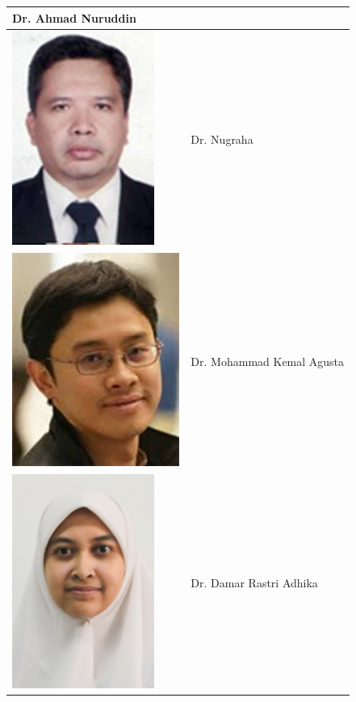 \documentclass[a0,landscape]{a0poster}
\begin{document}
\begin{multicols}{3}
\begin{tcolorbox}[
  colback=blue!5,
  colframe=green!40!black,
  title=Anggota]
{\begin{tabular}{
|>{\centering\arraybackslash}m{8cm}
|>{\centering\arraybackslash}m{25cm}|}
Dr. Ahmad Nuruddin \\
\hline
\includegraphics[height=7cm]{Nugraha.png} &
Dr. Nugraha \\
\hline
\includegraphics[height=7cm]{KemalAgusta.png} &
Dr. Mohammad Kemal Agusta \\
\hline
\includegraphics[height=7cm]{DamarRastriAdhika.png} &
Dr. Damar Rastri Adhika \\
\hline

\end{tabular}}
\end{tcolorbox}
\end{multicols}
\end{document}
